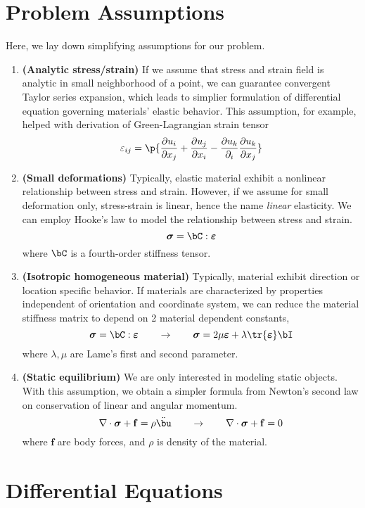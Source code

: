 \documentclass[11pt]{article}
\newcommand{\bheading}[1]{\textbf{(#1)}}
\newcommand{\bsigma}{\boldsymbol{\sigma}}
\newcommand{\bepsilon}{\boldsymbol{\varepsilon}}
\renewcommand{\epsilon}{\varepsilon}
\renewcommand{\bf}{\mathbf{f}}
\begin{document}
\section*{Problem Assumptions}

Here, we lay down simplifying assumptions for our problem.
\begin{enumerate}
    \item \bheading{Analytic stress/strain} If we assume that stress and strain field is analytic in small neighborhood of a point, we can guarantee convergent Taylor series expansion, which leads to simplier formulation of differential equation governing materials' elastic behavior. This assumption, for example, helped with derivation of Green-Lagrangian strain tensor
    \[
        \epsilon_{ij} = \p{
            \frac{\partial u_i}{\partial x_j} + 
            \frac{\partial u_j}{\partial x_i} -
            \frac{\partial u_k}{\partial _i}\frac{\partial u_k}{\partial x_j}
        }    
    \]
    \item \bheading{Small deformations} Typically, elastic material exhibit a nonlinear relationship between stress and strain. However, if we assume for small deformation only, stress-strain is linear, hence the name \textit{linear} elasticity. We can employ Hooke's law to model the relationship between stress and strain.
    \[
        \bsigma = \bC : \bepsilon
    \]
    where $\bC$ is a fourth-order stiffness tensor.
    \item \bheading{Isotropic homogeneous material} Typically, material exhibit direction or location specific behavior. If materials are characterized by properties independent of orientation and coordinate system, we can reduce the material stiffness matrix to depend on 2 material dependent constants,
    \[
        \bsigma = \bC : \bepsilon
        \quad \quad \rightarrow \quad \quad
        \bsigma = 2\mu\bepsilon + \lambda \tr{\bepsilon} \bI
    \]
    where $\lambda,\mu$ are Lame's first and second parameter.
    \item \bheading{Static equilibrium} We are only interested in modeling static objects. With this assumption, we obtain a simpler formula from Newton's second law on conservation of linear and angular momentum.
    \[
        \nabla\cdot\bsigma + \bf = \rho \ddot{\bu}
        \quad \quad \rightarrow \quad \quad
        \nabla\cdot\bsigma + \bf = 0
    \]
    where $\bf$ are body forces, and $\rho$ is density of the material.
\end{enumerate}


\section*{Differential Equations}
\end{document}

